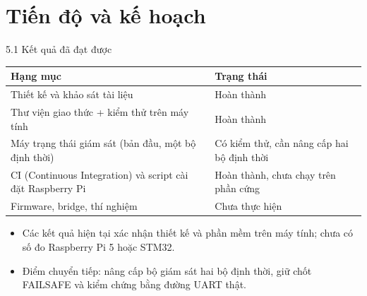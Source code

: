 \documentclass[aspectratio=169,12pt,t]{beamer}
\renewcommand{\arraystretch}{1.02}
\begin{document}
\section{Tiến độ và kế hoạch}
\begin{frame}{5.1 Kết quả đã đạt được}
\relax
\normalsize

\renewcommand{\arraystretch}{1.35}
\begin{tabular}{@{}L{.48\textwidth}@{\hspace{.06\textwidth}}L{.40\textwidth}@{}}
\toprule
\textbf{Hạng mục} & \textbf{Trạng thái}\\\midrule
Thiết kế và khảo sát tài liệu & Hoàn thành\\
Thư viện giao thức + kiểm thử trên máy tính & Hoàn thành\\
Máy trạng thái giám sát (bản đầu, một bộ định thời) & Có kiểm thử, cần nâng cấp hai bộ định thời\\
CI (Continuous Integration) và script cài đặt Raspberry Pi & Hoàn thành, chưa chạy trên phần cứng\\
Firmware, bridge, thí nghiệm & Chưa thực hiện\\
\bottomrule
\end{tabular}\par

\vfill
\begin{itemize}
\item Các kết quả hiện tại xác nhận thiết kế và phần mềm trên máy tính; chưa có số đo Raspberry Pi 5 hoặc STM32.
\item Điểm chuyển tiếp: nâng cấp bộ giám sát hai bộ định thời, giữ chốt FAILSAFE và kiểm chứng bằng đường UART thật.
\end{itemize}
\end{frame}
\end{document}
